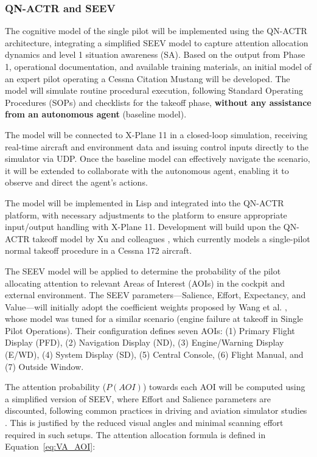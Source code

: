 \documentclass[12pt,a4paper]{article} %
\begin{document}
	\subsubsection{QN-ACTR and SEEV}
	\label{qn-actr-seev}
	The cognitive model of the single pilot will be implemented using the QN-ACTR architecture, integrating a simplified SEEV model to capture attention allocation dynamics and level 1 situation awareness (SA). Based on the output from Phase 1, operational documentation, and available training materials, an initial model of an expert pilot operating a Cessna Citation Mustang will be developed. The model will simulate routine procedural execution, following Standard Operating Procedures (SOPs) and checklists for the takeoff phase, \textbf{without any assistance from an autonomous agent} (baseline model).

	The model will be connected to X-Plane 11 in a closed-loop simulation, receiving real-time aircraft and environment data and issuing control inputs directly to the simulator via UDP. Once the baseline model can effectively navigate the scenario, it will be extended to collaborate with the autonomous agent, enabling it to observe and direct the agent's actions.
	
	The model will be implemented in Lisp and integrated into the QN-ACTR platform, with necessary adjustments to the platform to ensure appropriate input/output handling with X-Plane 11. Development will build upon the QN-ACTR takeoff model by Xu and colleagues \parencite{xu_modeling_2021}, which currently models a single-pilot normal takeoff procedure in a Cessna 172 aircraft.
	
	The SEEV model will be applied to determine the probability of the pilot allocating attention to relevant Areas of Interest (AOIs) in the cockpit and external environment. The SEEV parameters—Salience, Effort, Expectancy, and Value—will initially adopt the coefficient weights proposed by Wang et al. \parencite{wang_real-time_2024}, whose model was tuned for a similar scenario (engine failure at takeoff in Single Pilot Operations). Their configuration defines seven AOIs: (1) Primary Flight Display (PFD), (2) Navigation Display (ND), (3) Engine/Warning Display (E/WD), (4) System Display (SD), (5) Central Console, (6) Flight Manual, and (7) Outside Window.
	
	The attention probability ($P(AOI)$) towards each AOI will be computed using a simplified version of SEEV, where Effort and Salience parameters are discounted, following common practices in driving and aviation simulator studies \parencite{rehman_phd_thesis}. This is justified by the reduced visual angles and minimal scanning effort required in such setups. The attention allocation formula is defined in Equation~\ref{eq:VA_AOI}: %
	
\end{document}
